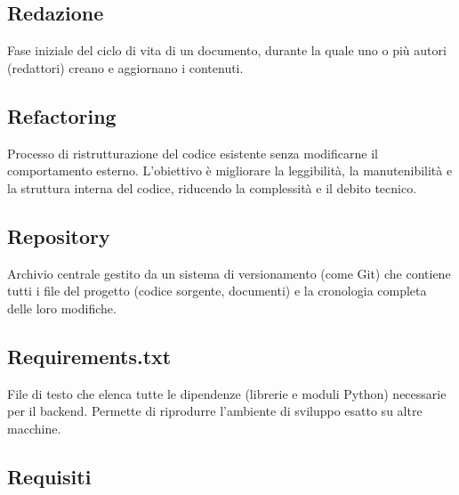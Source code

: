 \documentclass[a4paper, 11pt, oneside]{scrartcl} %
\begin{document}
\vspace{0.5cm}

\subsection*{Redazione}


Fase iniziale del ciclo di vita di un documento, durante la quale uno o più autori (redattori) creano e aggiornano i contenuti.

\vspace{0.5cm}

\subsection*{Refactoring}
Processo di ristrutturazione del codice esistente senza modificarne il comportamento esterno. L'obiettivo è migliorare la leggibilità, la manutenibilità e la struttura interna del codice, riducendo la complessità e il debito tecnico.
\vspace{0.5cm}

\subsection*{Repository}


Archivio centrale gestito da un sistema di versionamento (come Git) che contiene tutti i file del progetto (codice sorgente, documenti) e la cronologia completa delle loro modifiche.

\vspace{0.5cm}

\subsection*{Requirements.txt}


File di testo che elenca tutte le dipendenze (librerie e moduli Python) necessarie per il backend. Permette di riprodurre l'ambiente di sviluppo esatto su altre macchine.

\vspace{0.5cm}

\subsection*{Requisiti}
\end{document}
